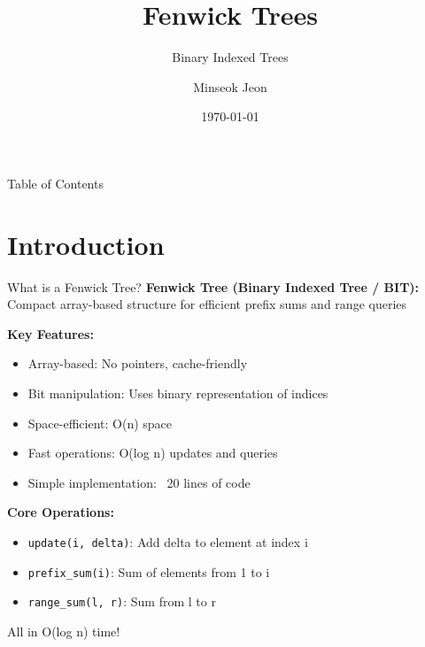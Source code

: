 \documentclass[aspectratio=169]{beamer}
\title{Fenwick Trees}
\subtitle{Binary Indexed Trees}
\author{Minseok Jeon}
\institute{DGIST}
\date{\today}
\begin{document}
\begin{frame}
  \titlepage
\end{frame}

\begin{frame}{Table of Contents}
  \tableofcontents
\end{frame}

\section{Introduction}

\begin{frame}{What is a Fenwick Tree?}
  \textbf{Fenwick Tree (Binary Indexed Tree / BIT):} Compact array-based structure for efficient prefix sums and range queries

  \vspace{0.5cm}
  \textbf{Key Features:}
  \begin{itemize}
    \item Array-based: No pointers, cache-friendly
    \item Bit manipulation: Uses binary representation of indices
    \item Space-efficient: O(n) space
    \item Fast operations: O(log n) updates and queries
    \item Simple implementation: ~20 lines of code
  \end{itemize}

  \vspace{0.5cm}
  \textbf{Core Operations:}
  \begin{itemize}
    \item \texttt{update(i, delta)}: Add delta to element at index i
    \item \texttt{prefix\_sum(i)}: Sum of elements from 1 to i
    \item \texttt{range\_sum(l, r)}: Sum from l to r
  \end{itemize}

  \vspace{0.3cm}
  All in O(log n) time!
\end{frame}
\end{document}
